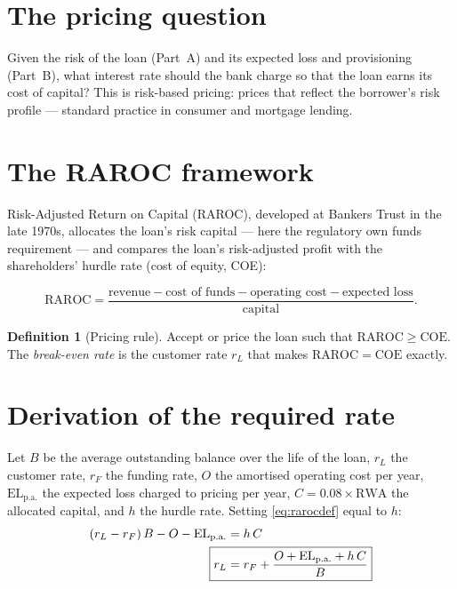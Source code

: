 \documentclass[11pt,a4paper]{report}
\theoremstyle{definition}
\newtheorem{definition}{Definition}[chapter]
\theoremstyle{plain}
\newcommand{\RWA}{\mathrm{RWA}}
\newcommand{\EL}{\mathrm{EL}}
\newcommand{\raroc}{\mathrm{RAROC}}
\begin{document}
\section{The pricing question}

Given the risk of the loan (Part~A) and its expected loss and
provisioning (Part~B), what interest rate should the bank charge so
that the loan earns its cost of capital? This is risk-based pricing:
prices that reflect the borrower's risk profile --- standard practice
in consumer and mortgage lending.

\section{The RAROC framework}

Risk-Adjusted Return on Capital (RAROC), developed at Bankers Trust in
the late 1970s, allocates the loan's risk capital --- here the
regulatory own funds requirement --- and compares the loan's
risk-adjusted profit with the shareholders' hurdle rate (cost of
equity, COE):

\begin{equation}
  \raroc=\frac{\text{revenue}-\text{cost of funds}
  -\text{operating cost}-\text{expected loss}}{\text{capital}} .
  \label{eq:rarocdef}
\end{equation}

\begin{definition}[Pricing rule]
Accept or price the loan such that $\raroc\ge \text{COE}$. The
\emph{break-even rate} is the customer rate $r_L$ that makes
$\raroc=\text{COE}$ exactly.
\end{definition}

\section{Derivation of the required rate}

Let $B$ be the average outstanding balance over the life of the loan,
$r_L$ the customer rate, $r_F$ the funding rate, $O$ the amortised
operating cost per year, $\EL_{\text{p.a.}}$ the expected loss charged
to pricing per year, $C=0.08\times\RWA$ the allocated capital, and $h$
the hurdle rate. Setting \eqref{eq:rarocdef} equal to $h$:
\begin{align}
  (r_L-r_F)\,B - O - \EL_{\text{p.a.}} &= h\,C\\
  \Aboxed{r_L &= r_F+\frac{O+\EL_{\text{p.a.}}+h\,C}{B}}
  \label{eq:breakeven}
\end{align}
\end{document}

